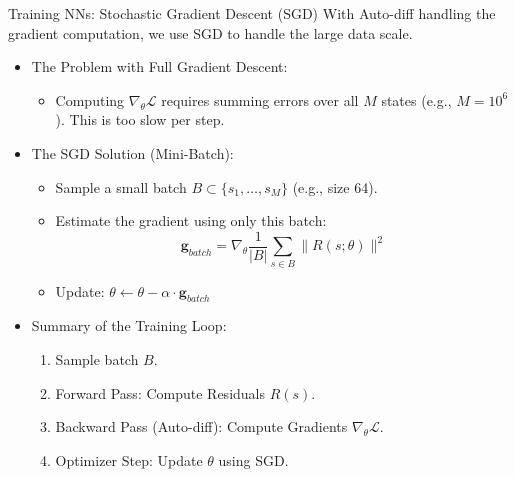 \documentclass[aspectratio=169]{beamer}
\newcommand{\1}{\mathbf{1}}
\begin{document}
\begin{frame}{Training NNs: Stochastic Gradient Descent (SGD)}
    \small
    With Auto-diff handling the gradient computation, we use SGD to handle the large data scale.
    
    \begin{itemize}
        \item The Problem with Full Gradient Descent:
        \begin{itemize}
            \item Computing $\nabla_\theta \mathcal{L}$ requires summing errors over all $M$ states (e.g., $M=10^6$). This is too slow per step.
        \end{itemize}
        
        \item The SGD Solution (Mini-Batch):
        \begin{itemize}
            \item Sample a small batch $B \subset \{s_1, \dots, s_M\}$ (e.g., size 64).
            \item Estimate the gradient using only this batch:
            $$ \mathbf{g}_{batch} = \nabla_\theta \frac{1}{|B|} \sum_{s \in B} \| R(s; \theta) \|^2 $$
            \item Update: $\theta \leftarrow \theta - \alpha \cdot \mathbf{g}_{batch}$
        \end{itemize}
        
        \item Summary of the Training Loop:
        \begin{enumerate}
            \item Sample batch $B$.
            \item Forward Pass: Compute Residuals $R(s)$.
            \item Backward Pass (Auto-diff): Compute Gradients $\nabla_\theta \mathcal{L}$.
            \item Optimizer Step: Update $\theta$ using SGD.
        \end{enumerate}
    \end{itemize}
\end{frame}
\end{document}
